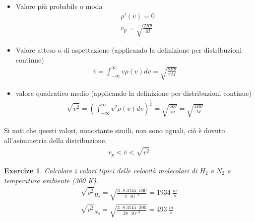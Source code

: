 \documentclass[10pt,a4paper]{article}
\newtheorem{exercize}{Exercize}
\begin{document}
\begin{itemize}
	\item Valore più probabile o moda
	\begin{align*}
		&\rho'(v)  =  0\\
		&v_p = \sqrt{\frac{2R\theta}{M}}
	\end{align*}
	\item Valore atteso o di aspettazione (applicando la definizione per distribuzioni continue)
	\begin{align*}
		\overline{v} = \int_{-\infty}^{\infty}v \rho(v)dv = \sqrt{\frac{8R\theta}{\pi M}}
	\end{align*}
	\item valore quadratico medio (applicando la definizione per distribuzioni continue)
	\begin{align*}
			\sqrt{\overline{v^2}} = \left(\int_{-\infty}^{\infty}v^2 \rho(v)dv\right)^{\frac{1}{2}} = \sqrt{\frac{3k\theta}{m}}= \sqrt{\frac{3R\theta}{M}}
	\end{align*}
\end{itemize}
Si noti che questi valori, nonostante simili, non sono uguali, ciò è dovuto all'asimmetria della distribuzione. 
\begin{align*}
	v_p<\overline{v}<\sqrt{\overline{v^2}}
\end{align*}
\begin{exercize}
	Calcolare i valori tipici delle velocità molecolari di $H_2$ e $N_2$ a temperatura ambiente (300 K).
	\begin{align*}
		\sqrt{\overline{v^2}}_{H_2}=\sqrt{\frac{3\cdot 8.3145\cdot 300}{2\cdot 10^{-3}}}=1934\ \frac{m}{s}\\
			\sqrt{\overline{v^2}}_{N_2}=\sqrt{\frac{3\cdot 8.3145\cdot 300}{28\cdot 10^{-3}}}=493\ \frac{m}{s}\\
	\end{align*}
\end{exercize}
\end{document}
